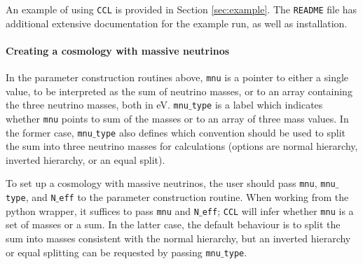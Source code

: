 \documentclass[\docopts]{\docclass}
\newcommand{\ccl}{{\tt CCL}\xspace}
\begin{document}
An example of using \ccl is provided in Section \ref{sec:example}. The {\tt README} file has additional extensive documentation for the example run, as well as installation.

\paragraph{Creating a cosmology with massive neutrinos}
In the parameter construction routines above, {\tt mnu} is a pointer to either a single value, to be interpreted as the sum of neutrino masses, or to an array containing the three neutrino masses, both in eV. {\tt mnu$\_$type} is a label which indicates whether {\tt mnu} points to sum of the masses or to an array of three mass values. In the former case, {\tt mnu$\_$type} also defines which convention should be used to split the sum into three neutrino masses for calculations (options are normal hierarchy, inverted hierarchy, or an equal split).

To set up a cosmology with massive neutrinos, the user should pass {\tt mnu}, {\tt mnu$\_$type}, and {\tt N$\_$eff} to the parameter construction routine. When working from the python wrapper, it suffices to pass {\tt mnu} and {\tt N$\_$eff}; \ccl will infer whether {\tt mnu} is a set of masses or a sum. In the latter case, the default behaviour is to split the sum into masses consistent with the normal hierarchy, but an inverted hierarchy or equal splitting can be requested by passing {\tt mnu$\_$type}. 
\end{document}
